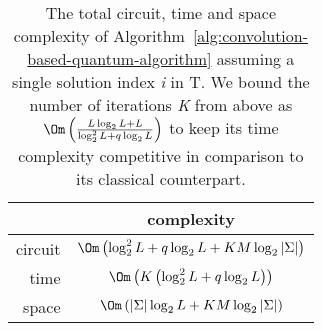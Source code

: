 \begin{table}[h!]
	\centering
	\begin{tabular}{| r || c |}
		\hline
		\quad            & complexity \\
		\hline\hline
		circuit           & $\Om\left( \log_2^2 L + q\log_2 L + KM\log_2 \vert \Sigma \vert \right)$\\
		\hline
		time             & $\Om\left( K\left(\log_2^2 L + q\log_2 L \right) \right)$\\
		\hline
		space           & $\Om\left(\vert \Sigma \vert\log_2 L + KM\log_2 \vert \Sigma \vert \right)$\\
		\hline
	\end{tabular}
	\caption{The total circuit, time and space complexity of Algorithm~\ref{alg:convolution-based-quantum-algorithm} assuming a single solution index \textit{i} in T. We bound the number of iterations \textit{K} from above as $\Om\left(\frac{L\log_2 L + L}{\log_2^2 L + q\log_2 L}\right)$ to keep its time complexity competitive in comparison to its classical counterpart.}
	\label{tab:conclusion-convolution-based-algorithm-complexities}
\end{table}


